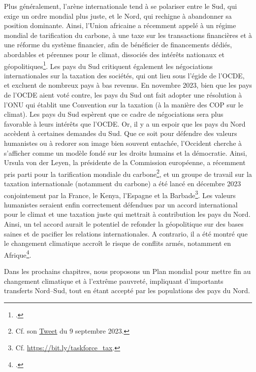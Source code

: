 \documentclass[a5paper,french,openany]{memoir}
\begin{document}
Plus généralement, l'arène internationale tend à se polariser entre le Sud, qui exige un ordre mondial plus juste, et le Nord, qui rechigne à abandonner sa position dominante. Ainsi, l'Union africaine a récemment appelé à un régime mondial de tarification du carbone, à une taxe sur les transactions financières et à une réforme du système financier, afin de bénéficier de financements dédiés, abordables et pérennes pour le climat, dissociés des intérêts nationaux et géopolitiques\footnote{\cite{african_union_african_2023}.}. Les pays du Sud critiquent également les négociations internationales sur la taxation des sociétés, qui ont lieu sous l'égide de l'OCDE, et excluent de nombreux pays à bas revenus. En novembre 2023, bien que les pays de l'OCDE aient voté contre, les pays du Sud ont fait adopter une résolution à l'ONU qui établit une Convention sur la taxation (à la manière des COP sur le climat). Les pays du Sud espèrent que ce cadre de négociations sera plus favorable à leurs intérêts que l'OCDE. Or, il y a un espoir que les pays du Nord accèdent à certaines demandes du Sud. 
Que ce soit pour défendre des valeurs humanistes ou à redorer son image bien souvent entachée, 
l'Occident cherche à s'afficher comme un modèle fondé sur les droits humains et la démocratie. 
Ainsi, Ursula von der Leyen, la présidente de la Commission européenne, a récemment pris parti pour la tarification mondiale du carbone\footnote{Cf. son \href{https://twitter.com/vonderleyen/status/1700416700238225659}{Tweet} du 9 septembre 2023.}, et un groupe de travail sur la taxation internationale (notamment du carbone) a été lancé en décembre 2023 conjointement par la France, le Kenya, l'Espagne et la Barbade\footnote{Cf. \href{https://www.elysee.fr/admin/upload/default/0001/15/91b013291db03bcc5f2f6b84de39a81ae0c04c7d.pdf}{https://bit.ly/taskforce\_tax}.}. 
Les valeurs humanistes seraient enfin correctement défendues par un accord international pour le climat et une taxation juste qui mettrait à contribution les pays du Nord. Ainsi, un tel accord aurait le potentiel de refonder la géopolitique sur des bases saines et de pacifier les relations internationales. A contrario, il a été montré que le changement climatique accroît le risque de conflits armés, notamment en Afrique\footnote{\cite{burke_warming_2009,eberle_heat_2020}.}.

Dans les prochains chapitres, nous proposons un Plan mondial pour mettre fin au changement climatique et à l'extrême pauvreté, impliquant d'importants transferts Nord--Sud, tout en étant accepté par %
les populations des pays du Nord.
\end{document}
